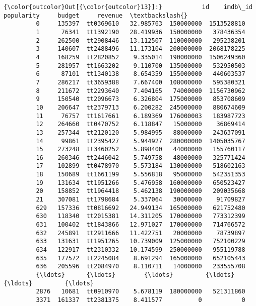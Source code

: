 \documentclass[11pt]{article}
\begin{document}
\begin{Verbatim}[commandchars=\\\{\}]
{\color{outcolor}Out[{\color{outcolor}13}]:}           id    imdb\_id  popularity     budget     revenue  \textbackslash{}
         0     135397  tt0369610   32.985763  150000000  1513528810   
         1      76341  tt1392190   28.419936  150000000   378436354   
         2     262500  tt2908446   13.112507  110000000   295238201   
         3     140607  tt2488496   11.173104  200000000  2068178225   
         4     168259  tt2820852    9.335014  190000000  1506249360   
         5     281957  tt1663202    9.110700  135000000   532950503   
         6      87101  tt1340138    8.654359  155000000   440603537   
         7     286217  tt3659388    7.667400  108000000   595380321   
         8     211672  tt2293640    7.404165   74000000  1156730962   
         9     150540  tt2096673    6.326804  175000000   853708609   
         10    206647  tt2379713    6.200282  245000000   880674609   
         11     76757  tt1617661    6.189369  176000003   183987723   
         12    264660  tt0470752    6.118847   15000000    36869414   
         13    257344  tt2120120    5.984995   88000000   243637091   
         14     99861  tt2395427    5.944927  280000000  1405035767   
         15    273248  tt3460252    5.898400   44000000   155760117   
         16    260346  tt2446042    5.749758   48000000   325771424   
         17    102899  tt0478970    5.573184  130000000   518602163   
         18    150689  tt1661199    5.556818   95000000   542351353   
         19    131634  tt1951266    5.476958  160000000   650523427   
         20    158852  tt1964418    5.462138  190000000   209035668   
         21    307081  tt1798684    5.337064   30000000    91709827   
         629   157336  tt0816692   24.949134  165000000   621752480   
         630   118340  tt2015381   14.311205  170000000   773312399   
         631   100402  tt1843866   12.971027  170000000   714766572   
         632   245891  tt2911666   11.422751   20000000    78739897   
         633   131631  tt1951265   10.739009  125000000   752100229   
         634   122917  tt2310332   10.174599  250000000   955119788   
         635   177572  tt2245084    8.691294  165000000   652105443   
         636   205596  tt2084970    8.110711   14000000   233555708   
         {\ldots}      {\ldots}        {\ldots}         {\ldots}        {\ldots}         {\ldots}   
         2876   10681  tt0910970    5.678119  180000000   521311860   
         3371  161337  tt2381375    8.411577          0           0   

\end{Verbatim}
\end{document}
